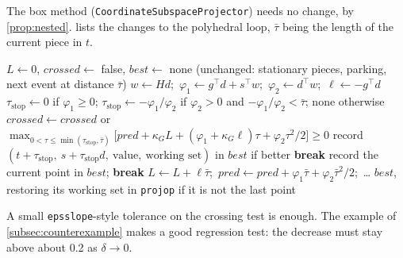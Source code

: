 \documentclass[11pt,a4paper]{article}
\numberwithin{equation}{section}
\theoremstyle{plain}
\theoremstyle{definition}
\theoremstyle{remark}
\newcommand{\kG}{\kappa_G}
\newcommand{\codeus}{\textunderscore\allowbreak}
\newcommand{\code}[1]{{\let\_\codeus\texttt{#1}}}
\begin{document}
The box method (\code{CoordinateSubspaceProjector}) needs no change, by \cref{prop:nested}.
 lists the changes to the polyhedral loop, $\bar\tau$ being the length of the
current piece in $t$.

\begin{algorithm}[ht]
\caption{Safeguarded scan (changes to the polyhedral loop of \code{cauchy\_step!})}\label{alg:scan}
\begin{algorithmic}[1]
\State $L\gets0$, $\mathit{crossed}\gets$ false, $\mathit{best}\gets$ none
  \State (unchanged: stationary pieces, parking, next event at distance $\bar\tau$)
    \State $w\gets Hd$;\ $\varphi_1\gets g^\top d+s^\top w$;\ $\varphi_2\gets d^\top w$;\ $\ell\gets-g^\top d$
    \State $\tau_{\mathrm{stop}}\gets0$ if $\varphi_1\ge0$;
    \Statex\hspace{\algorithmicindent}\hspace{\algorithmicindent}$\tau_{\mathrm{stop}}\gets-\varphi_1/\varphi_2$ if $\varphi_2>0$ and $-\varphi_1/\varphi_2<\bar\tau$; none otherwise
    \State $\mathit{crossed}\gets\mathit{crossed}$ or
    \Statex\hspace{\algorithmicindent}\hspace{\algorithmicindent}$\max_{0<\tau\le\min(\tau_{\mathrm{stop}},\bar\tau)}\big[\mathit{pred}+\kG L+(\varphi_1+\kG\ell)\tau+\varphi_2\tau^2/2\big]\ge0$
      \State record $(t+\tau_{\mathrm{stop}},\ s+\tau_{\mathrm{stop}}d,\ \text{value},\ \text{working set})$ in $\mathit{best}$ if better
       \textbf{break} 
      \EndIf
      \State {}
    \EndIf
  \EndIf
   record the current point in $\mathit{best}$; \textbf{break}
  \EndIf
  \State $L\gets L+\ell\bar\tau$;\ $\mathit{pred}\gets\mathit{pred}+\varphi_1\bar\tau+\varphi_2\bar\tau^2/2$;\ \ldots
\EndFor
\State \Return $\mathit{best}$, restoring its working set in \code{proj\_op} if it is not the last point
\end{algorithmic}
\end{algorithm}

A small \code{eps\_slope}-style tolerance on the crossing test is enough. The example of
\cref{subsec:counterexample} makes a good regression test: the decrease must stay above about
0.2 as $\delta\to0$.
\end{document}
